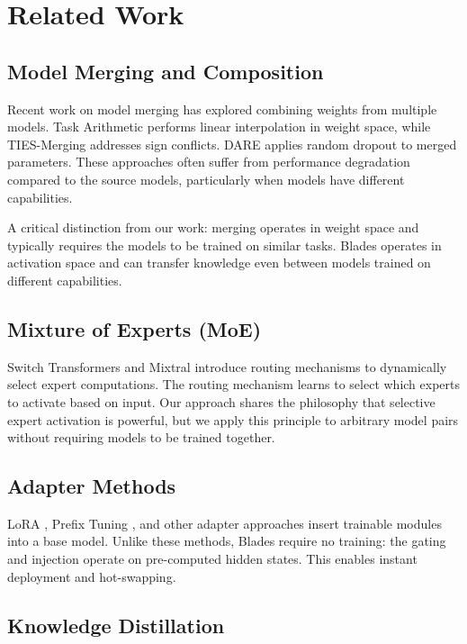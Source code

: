 \documentclass[11pt,a4paper]{article}
\begin{document}
\section{Related Work}

\subsection{Model Merging and Composition}

Recent work on model merging has explored combining weights from multiple models. Task Arithmetic \cite{ilharco2023task} performs linear interpolation in weight space, while TIES-Merging \cite{bieker2023ties} addresses sign conflicts. DARE \cite{curth2024dare} applies random dropout to merged parameters. These approaches often suffer from performance degradation compared to the source models, particularly when models have different capabilities.

A critical distinction from our work: merging operates in weight space and typically requires the models to be trained on similar tasks. Blades operates in activation space and can transfer knowledge even between models trained on different capabilities.

\subsection{Mixture of Experts (MoE)}

Switch Transformers \cite{lepikhin2021switch} and Mixtral \cite{jiang2024mixtral} introduce routing mechanisms to dynamically select expert computations. The routing mechanism learns to select which experts to activate based on input. Our approach shares the philosophy that selective expert activation is powerful, but we apply this principle to arbitrary model pairs without requiring models to be trained together.

\subsection{Adapter Methods}

LoRA \cite{hu2023lora}, Prefix Tuning \cite{li2021prefix}, and other adapter approaches insert trainable modules into a base model. Unlike these methods, Blades require no training: the gating and injection operate on pre-computed hidden states. This enables instant deployment and hot-swapping.

\subsection{Knowledge Distillation}
\end{document}

